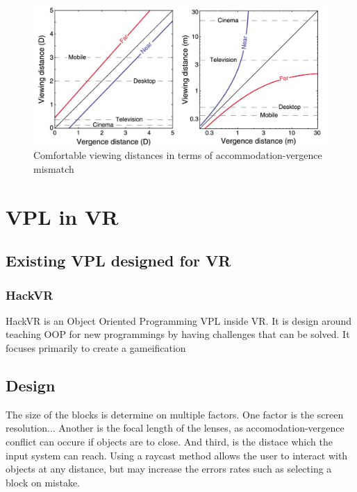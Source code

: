 \documentclass{sigchi}
\begin{document}
\begin{figure}[h]
  \includegraphics[width=\linewidth]{figures/ComfortViewingDiagram.png}
  \caption{Comfortable viewing distances in terms of accommodation-vergence mismatch}
  \label{fig:comfort_viewing_diagram}
\end{figure}



\section{VPL in VR}
\subsection{Existing VPL designed for VR}

\subsubsection{HackVR}
HackVR is an Object Oriented Programming VPL inside VR. It is design around teaching OOP for new programmings by having challenges that can be solved. It focuses primarily to create a gameification

\subsection{Design}
The size of the blocks is determine on multiple factors. One factor is the screen resolution... Another is the focal length of the lenses, as accomodation-vergence conflict can occure if objects are to close. And third, is the distace which the input system can reach. Using a raycast method allows the user to interact with objects at any distance, but may increase the errors rates such as selecting a block on mistake.
\end{document}
